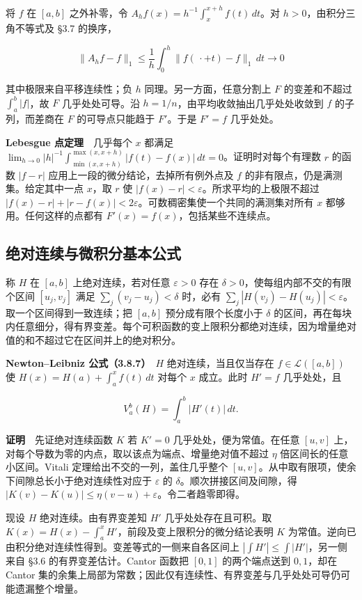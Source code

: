 \documentclass[11pt,a4paper]{article}
\begin{document}
将 \(f\) 在 \([a,b]\) 之外补零，令 \(A_h f(x)=h^{-1}\int_x^{x+h}f(t)\,dt\)。对 \(h>0\)，由积分三角不等式及 §3.7 的换序，

\[
\|A_h f-f\|_1\le\frac1h\int_0^h\|f(\,\cdot+t)-f\|_1\,dt\longrightarrow0
\]

其中极限来自平移连续性；负 \(h\) 同理。另一方面，任意分割上 \(F\) 的变差和不超过 \(\int_a^b|f|\)，故 \(F\) 几乎处处可导。沿 \(h=1/n\)，由平均收敛抽出几乎处处收敛到 \(f\) 的子列，而差商在 \(F\) 的可导点只能趋于 \(F'\)。于是 \(F'=f\) 几乎处处。

\textbf{Lebesgue 点定理}　几乎每个 \(x\) 都满足 \(\lim_{h\to0}|h|^{-1}\int_{\min(x,x+h)}^{\max(x,x+h)}|f(t)-f(x)|\,dt=0\)。证明时对每个有理数 \(r\) 的函数 \(|f-r|\) 应用上一段的微分结论，去掉所有例外点及 \(f\) 的非有限点，仍是满测集。给定其中一点 \(x\)，取 \(r\) 使 \(|f(x)-r|<\varepsilon\)。所求平均的上极限不超过 \(|f(x)-r|+|r-f(x)|<2\varepsilon\)。可数稠密集使一个共同的满测集对所有 \(x\) 都够用。任何这样的点都有 \(F'(x)=f(x)\)，包括某些不连续点。

\subsection*{绝对连续与微积分基本公式}\label{ux7eddux5bf9ux8fdeux7eedux4e0eux5faeux79efux5206ux57faux672cux516cux5f0f}

称 \(H\) 在 \([a,b]\) 上绝对连续，若对任意 \(\varepsilon>0\) 存在 \(\delta>0\)，使每组内部不交的有限个区间 \([u_j,v_j]\) 满足 \(\sum_j(v_j-u_j)<\delta\) 时，必有 \(\sum_j|H(v_j)-H(u_j)|<\varepsilon\)。取一个区间得到一致连续；把 \([a,b]\) 预分成有限个长度小于 \(\delta\) 的区间，再在每块内任意细分，得有界变差。每个可积函数的变上限积分都绝对连续，因为增量绝对值的和不超过它在区间并上的绝对积分。

\textbf{Newton--Leibniz 公式（3.8.7）}　\(H\) 绝对连续，当且仅当存在 \(f\in\mathcal L([a,b])\) 使 \(H(x)=H(a)+\int_a^x f(t)\,dt\) 对每个 \(x\) 成立。此时 \(H'=f\) 几乎处处，且

\[
V_a^b(H)=\int_a^b|H'(t)|\,dt.
\]

\textbf{证明}　先证绝对连续函数 \(K\) 若 \(K'=0\) 几乎处处，便为常值。在任意 \([u,v]\) 上，对每个导数为零的内点，取以该点为端点、增量绝对值不超过 \(\eta\) 倍区间长的任意小区间。Vitali 定理给出不交的一列，盖住几乎整个 \([u,v]\)。从中取有限项，使余下间隙总长小于绝对连续性对应于 \(\varepsilon\) 的 \(\delta\)。顺次拼接区间及间隙，得 \(|K(v)-K(u)|\le\eta(v-u)+\varepsilon\)。令二者趋零即得。

现设 \(H\) 绝对连续。由有界变差知 \(H'\) 几乎处处存在且可积。取 \(K(x)=H(x)-\int_a^x H'\)，前段及变上限积分的微分结论表明 \(K\) 为常值。逆向已由积分绝对连续性得到。变差等式的一侧来自各区间上 \(|\int H'|\le\int|H'|\)，另一侧来自 §3.6 的有界变差估计。Cantor 函数把 \([0,1]\) 的两个端点送到 \(0,1\)，却在 Cantor 集的余集上局部为常数；因此仅有连续性、有界变差与几乎处处可导仍可能遗漏整个增量。
\end{document}
